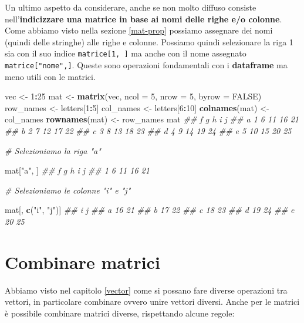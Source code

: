 \documentclass[
]{book}
\newenvironment{Shaded}{\begin{snugshade}}{\end{snugshade}}
\newcommand{\CommentTok}[1]{\textcolor[rgb]{0.56,0.35,0.01}{\textit{#1}}}
\newcommand{\DataTypeTok}[1]{\textcolor[rgb]{0.13,0.29,0.53}{#1}}
\newcommand{\DecValTok}[1]{\textcolor[rgb]{0.00,0.00,0.81}{#1}}
\newcommand{\KeywordTok}[1]{\textcolor[rgb]{0.13,0.29,0.53}{\textbf{#1}}}
\newcommand{\NormalTok}[1]{#1}
\newcommand{\OperatorTok}[1]{\textcolor[rgb]{0.81,0.36,0.00}{\textbf{#1}}}
\newcommand{\OtherTok}[1]{\textcolor[rgb]{0.56,0.35,0.01}{#1}}
\newcommand{\StringTok}[1]{\textcolor[rgb]{0.31,0.60,0.02}{#1}}
\begin{document}
Un ultimo aspetto da considerare, anche se non molto diffuso consiste nell'\textbf{indicizzare una matrice in base ai nomi delle righe e/o colonne}. Come abbiamo visto nella sezione \ref{mat-prop} possiamo assegnare dei nomi (quindi delle stringhe) alle righe e colonne. Possiamo quindi selezionare la riga 1 sia con il suo indice \texttt{matrice{[}1,\ {]}} ma anche con il nome assegnato \texttt{matrice{[}"nome",{]}}. Queste sono operazioni fondamentali con i \textbf{dataframe} ma meno utili con le matrici.

\begin{Shaded}
\begin{Highlighting}[]
\NormalTok{vec <-}\StringTok{ }\DecValTok{1}\OperatorTok{:}\DecValTok{25}
\NormalTok{mat <-}\StringTok{ }\KeywordTok{matrix}\NormalTok{(vec, }\DataTypeTok{ncol =} \DecValTok{5}\NormalTok{, }\DataTypeTok{nrow =} \DecValTok{5}\NormalTok{, }\DataTypeTok{byrow =} \OtherTok{FALSE}\NormalTok{)}
\NormalTok{row_names <-}\StringTok{ }\NormalTok{letters[}\DecValTok{1}\OperatorTok{:}\DecValTok{5}\NormalTok{]}
\NormalTok{col_names <-}\StringTok{ }\NormalTok{letters[}\DecValTok{6}\OperatorTok{:}\DecValTok{10}\NormalTok{]}
\KeywordTok{colnames}\NormalTok{(mat) <-}\StringTok{ }\NormalTok{col_names}
\KeywordTok{rownames}\NormalTok{(mat) <-}\StringTok{ }\NormalTok{row_names}
\NormalTok{mat}
\CommentTok{##   f  g  h  i  j}
\CommentTok{## a 1  6 11 16 21}
\CommentTok{## b 2  7 12 17 22}
\CommentTok{## c 3  8 13 18 23}
\CommentTok{## d 4  9 14 19 24}
\CommentTok{## e 5 10 15 20 25}

\CommentTok{# Selezioniamo la riga "a"}

\NormalTok{mat[}\StringTok{"a"}\NormalTok{, ]}
\CommentTok{##  f  g  h  i  j }
\CommentTok{##  1  6 11 16 21}

\CommentTok{# Selezioniamo le colonne "i" e "j"}

\NormalTok{mat[, }\KeywordTok{c}\NormalTok{(}\StringTok{"i"}\NormalTok{, }\StringTok{"j"}\NormalTok{)]}
\CommentTok{##    i  j}
\CommentTok{## a 16 21}
\CommentTok{## b 17 22}
\CommentTok{## c 18 23}
\CommentTok{## d 19 24}
\CommentTok{## e 20 25}
\end{Highlighting}
\end{Shaded}

\hypertarget{combinare-matrici}{%
\section{Combinare matrici}\label{combinare-matrici}}

Abbiamo visto nel capitolo \ref{vector} come si possano fare diverse operazioni tra vettori, in particolare combinare ovvero unire vettori diversi. Anche per le matrici è possibile combinare matrici diverse, rispettando alcune regole:
\end{document}

